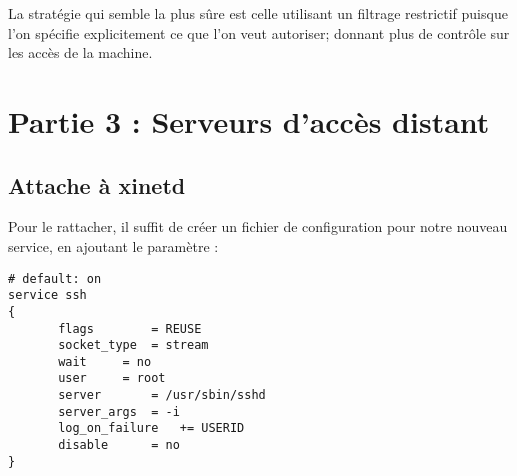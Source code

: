 \documentclass[12pt,a4paper,notitlepage]{article}
\begin{document}
La stratégie qui semble la plus sûre est celle utilisant un filtrage restrictif puisque l'on spécifie explicitement ce que l'on veut autoriser; donnant plus de contrôle sur les accès de la machine.


\section{Partie 3 : Serveurs d'accès distant}

\subsection{Attache à xinetd}

Pour le rattacher, il suffit de créer un fichier de configuration pour notre nouveau service, en ajoutant le paramètre :\\

\begin{lstlisting}
# default: on
service ssh
{
       flags		= REUSE
       socket_type	= stream
       wait		= no
       user		= root
       server		= /usr/sbin/sshd
       server_args	= -i
       log_on_failure	+= USERID
       disable		= no
}
\end{lstlisting}
\end{document}
